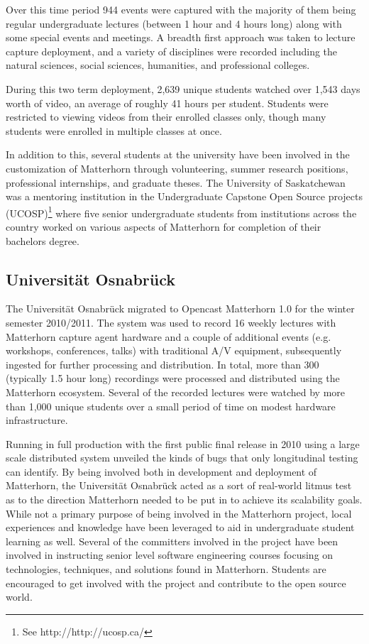 \documentclass{sig-alternate}
\begin{document}
Over this time period 944 events were captured with the majority of them being regular undergraduate lectures (between 1 hour and 4 hours long) along with some special events and meetings.  A breadth first approach was taken to lecture capture deployment, and a variety of disciplines were recorded including the natural sciences, social sciences, humanities, and professional colleges.

During this two term deployment, 2,639 unique students watched over 1,543 days worth of video, an average of roughly 41 hours per student.  Students were restricted to viewing videos from their enrolled classes only, though many students were enrolled in multiple classes at once.

In addition to this, several students at the university have been involved in the customization of Matterhorn through volunteering, summer research positions, professional internships, and graduate theses.  The University of Saskatchewan was a mentoring institution in the Undergraduate Capstone Open Source projects (UCOSP)\footnote{See http://http://ucosp.ca/} where five senior undergraduate students from institutions across the country worked on various aspects of Matterhorn for completion of their bachelors degree.

\subsection{Universit\"{a}t Osnabr\"{u}ck}
The Universit\"{a}t Osnabr\"{u}ck migrated to Opencast Matterhorn 1.0 for the winter semester 2010/2011. The system was used to record 16 weekly lectures with Matterhorn capture agent hardware and a couple of additional events (e.g. workshops, conferences, talks) with traditional A/V equipment, subsequently ingested for further processing and distribution. In total, more than 300 (typically 1.5 hour long) recordings were processed and distributed using the Matterhorn ecosystem. Several of the recorded lectures were watched by more than 1,000 unique students over a small period of time on modest hardware infrastructure.

Running in full production with the first public final release in 2010 using a large scale distributed system unveiled the kinds of bugs that only longitudinal testing can identify.  By being involved both in development and deployment of Matterhorn, the Universit\"{a}t Osnabr\"{u}ck acted as a sort of real-world litmus test as to the direction Matterhorn needed to be put in to achieve its scalability goals.  While not a primary purpose of being involved in the Matterhorn project, local experiences and knowledge have been leveraged to aid in undergraduate student learning as well.  Several of the committers involved in the project have been involved in instructing senior level software engineering courses focusing on technologies, techniques, and solutions found in Matterhorn.  Students are encouraged to get involved with the project and contribute to the open source world.
\end{document}
